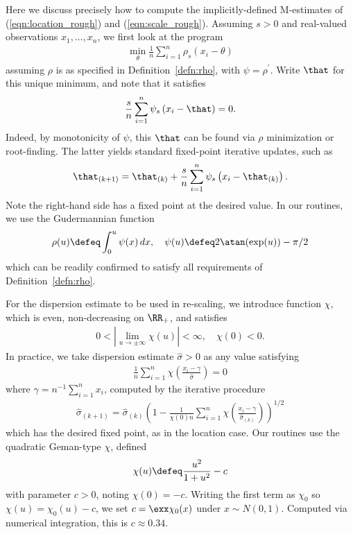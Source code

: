 \documentclass[11pt,oneside]{article}
\theoremstyle{definition} \newtheorem{defn}{Definition}       %
\theoremstyle{plain} \newtheorem{prop}[defn]{Proposition}           %
\theoremstyle{plain} \newtheorem{thm}[defn]{Theorem}                %
\theoremstyle{plain} \newtheorem{lem}[defn]{Lemma}                  %
\theoremstyle{plain} \newtheorem{cor}[defn]{Corollary}              %
\theoremstyle{remark} \newtheorem{rmk}[defn]{Remark}                %
\theoremstyle{remark} \newtheorem{ex}[defn]{Example}                %
\begin{document}
Here we discuss precisely how to compute the implicitly-defined M-estimates of (\ref{eqn:location_rough}) and (\ref{eqn:scale_rough}). Assuming $s>0$ and real-valued observations $x_{1},\ldots,x_{n}$, we first look at the program
%
\begin{align*}
\min_{\theta} \frac{1}{n} \sum_{i=1}^{n}\rho_{s}\left(x_{i}-\theta\right)
\end{align*}
%
assuming $\rho$ is as specified in Definition~\ref{defn:rho}, with $\psi = \rho^{\prime}$. Write $\that$ for this unique minimum, and note that it satisfies
%
\begin{align*}
\frac{s}{n} \sum_{i=1}^{n}\psi_{s}\left(x_{i}-\that\right) = 0.
\end{align*}
%
Indeed, by monotonicity of $\psi$, this $\that$ can be found via $\rho$ minimization or root-finding. The latter yields standard fixed-point iterative updates, such as
%
\begin{align*}
\that_{(k+1)} = \that_{(k)} + \frac{s}{n}\sum_{i=1}^{n}\psi_{s}\left(x_{i}-\that_{(k)}\right).
\end{align*}
%
Note the right-hand side has a fixed point at the desired value. In our routines, we use the Gudermannian function
%
\begin{align*}
\rho(u) \defeq \int_{0}^{u}\psi(x)\,dx, \quad \psi(u) \defeq 2\atan(\exp(u))-\pi/2
\end{align*}
%
which can be readily confirmed to satisfy all requirements of Definition~\ref{defn:rho}.

For the dispersion estimate to be used in re-scaling, we introduce function $\chi$, which is even, non-decreasing on $\RR_{+}$, and satisfies
%
\begin{align*}
0 < \left|\lim\limits_{u \to \pm \infty} \chi(u)\right| < \infty, \quad \chi(0) < 0.
\end{align*}
%
In practice, we take dispersion estimate $\widehat{\sigma}>0$ as any value satisfying
%
\begin{align*}
\frac{1}{n} \sum_{i=1}^{n} \chi\left(\frac{x_{i}-\gamma}{\widehat{\sigma}}\right) = 0
\end{align*}
%
where $\gamma = n^{-1}\sum_{i=1}^{n}x_{i}$, computed by the iterative procedure
%
\begin{align*}
\widehat{\sigma}_{(k+1)} = \widehat{\sigma}_{(k)}\left(1-\frac{1}{\chi(0)n}\sum_{i=1}^{n}\chi\left(\frac{x_{i}-\gamma}{\widehat{\sigma}_{(k)}}\right)\right)^{1/2}
\end{align*}
%
which has the desired fixed point, as in the location case. Our routines use the quadratic Geman-type $\chi$, defined
%
\begin{align*}
\chi(u) \defeq \frac{u^{2}}{1+u^{2}}-c
\end{align*}
%
with parameter $c > 0$, noting $\chi(0)=-c$. Writing the first term as $\chi_{0}$ so $\chi(u)=\chi_{0}(u)-c$, we set $c = \exx\chi_{0}(x)$ under $x \sim N(0,1)$. Computed via numerical integration, this is $c \approx 0.34$.
\end{document}
